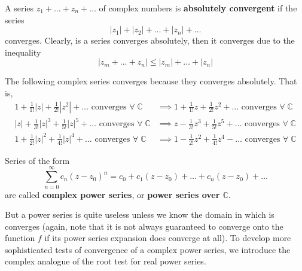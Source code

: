 \documentclass{article}
\begin{document}
  \begin{definition}
    A series $z_1 + \ldots + z_n + \ldots$ of complex numbers is \textbf{absolutely convergent} if the series
    \[|z_1| + |z_2| + \ldots + |z_n| + \ldots\]
    converges. Clearly, is a series converges absolutely, then it converges due to the inequality
    \[|z_m + \ldots + z_n| \leq |z_m| + \ldots + |z_n|\]
  \end{definition}

  \begin{example}
    The following complex series converges because they converges absolutely. That is, 
    \begin{align*}
        1 + \frac{1}{1!}|z| + \frac{1}{2!}|z^2| + \ldots \text{ converges } \forall \; \mathbb{C} & \implies 1 + \frac{1}{1!}z + \frac{1}{2!}z^2 + \ldots \text{ converges } \forall \; \mathbb{C} \\
        |z| + \frac{1}{3!}|z|^3 + \frac{1}{5!}|z|^5 + \ldots \text{ converges } \forall \; \mathbb{C}  & \implies z - \frac{1}{3!} z^3 + \frac{1}{5!}z^5 + \ldots \text{ converges } \forall \; \mathbb{C} \\
        1 + \frac{1}{2!}|z|^2 + \frac{1}{4!} |z|^4 + \ldots \text{ converges }  \forall \; \mathbb{C} & \implies 1 - \frac{1}{2!}z^2 + \frac{1}{4!} z^4 - \ldots \text{ converges }  \forall \; \mathbb{C} 
    \end{align*}
  \end{example}

  \begin{definition}
    Series of the form 
    \[\sum_{n=0}^\infty c_n (z - z_0)^n = c_0 + c_1 (z - z_0) + \ldots + c_n (z - z_0) + \ldots\]
    are called \textbf{complex power series}, or \textbf{power series over $\mathbb{C}$}. 
  \end{definition}

  But a power series is quite useless unless we know the domain in which is converges (again, note that it is not always guaranteed to converge onto the function $f$ if its power series expansion does converge at all). To develop more sophisticated tests of convergence of a complex power series, we introduce the complex analogue of the root test for real power series. 
\end{document}
